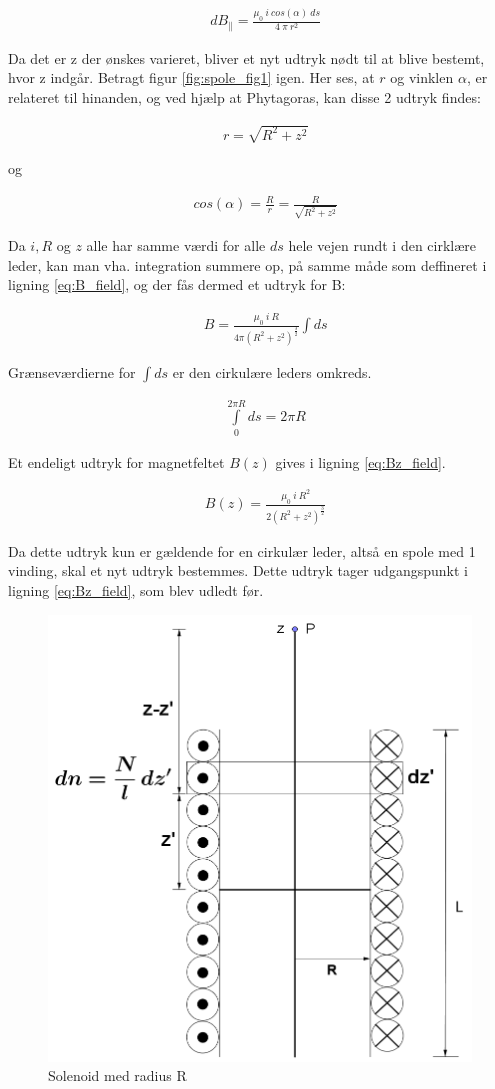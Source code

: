 \begin{align}
&dB_\parallel=\frac{\mu_0 \:i\: cos(\alpha)\:ds}{4\:\pi\: r^2}
\end{align}

Da det er z der ønskes varieret, bliver et nyt udtryk nødt til at blive bestemt, hvor z indgår. Betragt figur \ref{fig:spole_fig1} igen. Her ses, at $r$ og vinklen $\alpha$, er relateret til hinanden, og ved hjælp at Phytagoras, kan disse 2 udtryk findes:


\begin{align}
&r=\sqrt{R^2+z^2}
\end{align}

og

\begin{align}
&cos(\alpha)=\frac{R}{r}=\frac{R}{\sqrt{R^2+z^2}}
\end{align}

Da $i, R$ og $z$ alle har samme værdi for alle $ds$ hele vejen rundt i den cirklære leder, kan man vha. integration summere op, på samme måde som deffineret i ligning \ref{eq:B_field}, og der fås dermed et udtryk for B:



\begin{align}
&B=\frac{\mu_0 \: i \: R}{4\pi(R^2+z^2)^\frac{3}{2}}\int ds
\end{align}

Grænseværdierne for $\int ds$ er den cirkulære leders omkreds.

\begin{align}
&\int\limits_{0}^{2\pi R} ds = 2\pi R
\end{align}

Et endeligt udtryk for magnetfeltet $B(z)$ gives i ligning \ref{eq:Bz_field}.

\begin{align}
	&B(z)=\frac{\mu_0 \: i \: R^2}{2(R^2+z^2)^\frac{3}{2}} \label{eq:Bz_field}
\end{align}


Da dette udtryk kun er gældende for en cirkulær leder, altså en spole med 1 vinding, skal et nyt udtryk bestemmes. Dette udtryk tager udgangspunkt i ligning \ref{eq:Bz_field}, som blev udledt før.

\begin{figure}[h!]
	\centering
	\includegraphics[width=.5\textwidth]{billeder/B_felt2.png}
	\caption{Solenoid med radius R}
	\label{fig:spole_fig2}
\end{figure}

